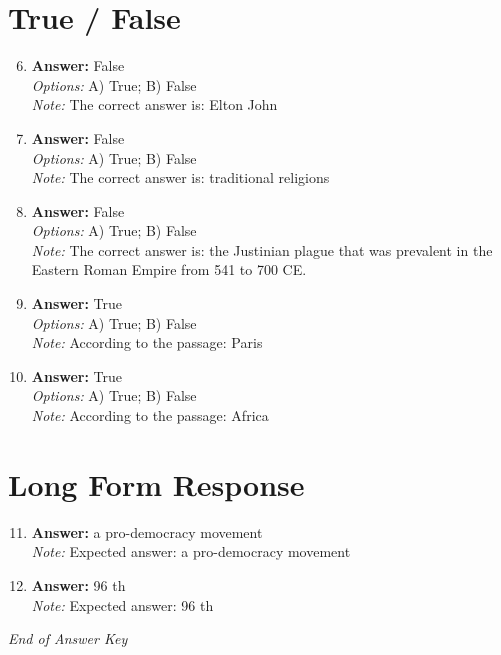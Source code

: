 \documentclass[12pt]{article}
\begin{document}
\section*{True / False}
\begin{enumerate}[label=\arabic*.]
\setcounter{enumi}{5}
\item \textbf{Answer:} False
\\ \textit{Options:} A) True; B) False
\\ \textit{Note:} The correct answer is: Elton John
\item \textbf{Answer:} False
\\ \textit{Options:} A) True; B) False
\\ \textit{Note:} The correct answer is: traditional religions
\item \textbf{Answer:} False
\\ \textit{Options:} A) True; B) False
\\ \textit{Note:} The correct answer is: the Justinian plague that was prevalent in the Eastern Roman Empire from 541 to 700 CE.
\item \textbf{Answer:} True
\\ \textit{Options:} A) True; B) False
\\ \textit{Note:} According to the passage: Paris
\item \textbf{Answer:} True
\\ \textit{Options:} A) True; B) False
\\ \textit{Note:} According to the passage: Africa
\end{enumerate}

\section*{Long Form Response}
\begin{enumerate}[label=\arabic*.]
\setcounter{enumi}{10}
\item \textbf{Answer:} a pro-democracy movement
\\ \textit{Note:} Expected answer: a pro-democracy movement
\item \textbf{Answer:} 96 th
\\ \textit{Note:} Expected answer: 96 th
\end{enumerate}

\vfill
\noindent\textit{End of Answer Key}
\end{document}
